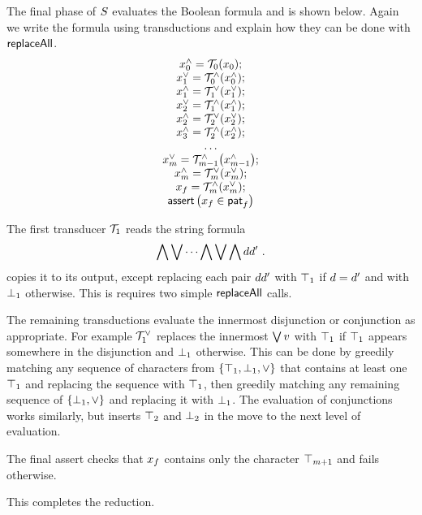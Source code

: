 The final phase of $S$ evaluates the Boolean formula and is shown below.
Again we write the formula using transductions and explain how they can be done
with $\mathsf{replaceAll}$.
\[
    \begin{array}{c}
        x^\land_0 = {\mathcal{T}_0}\mathord{\left(x_0\right)}; \\
        x^\lor_1 = {\mathcal{T}^\land_0}\mathord{\left(x^\land_0\right)}; \\
        x^\land_1 = {\mathcal{T}^\lor_1}\mathord{\left(x^\lor_1\right)}; \\
        x^\lor_2 = {\mathcal{T}^\land_1}\mathord{\left(x^\land_1\right)}; \\
        x^\land_2 = {\mathcal{T}^\lor_2}\mathord{\left(x^\lor_2\right)}; \\
        x^\land_3 = {\mathcal{T}^\land_2}\mathord{\left(x^\land_2\right)}; \\
        \ldots \\
        x^\lor_m
            = {\mathcal{T}^\land_{m-1}}\mathord{\left(x^\land_{m-1}\right)}; \\
        x^\land_m
            = {\mathcal{T}^\lor_m}\mathord{\left(x^\lor_{m}\right)}; \\
        x_f
            = {\mathcal{T}^\land_m}\mathord{\left(x^\lor_{m}\right)}; \\
        \textsf{assert}\left(x_f \in \mathsf{pat}_f\right)
    \end{array}
\]

The first transducer $\mathcal{T}_1$ reads the string formula
\[
    \bigwedge \bigvee \cdots \bigwedge \bigvee \bigwedge d d' \ .
\]
copies it to its output, except replacing each pair
$d d'$
with $\top_{1}$ if $d = d'$ and with $\bot_{1}$ otherwise.
This is requires two simple $\mathsf{replaceAll}$ calls.

The remaining transductions evaluate the innermost disjunction or conjunction as
appropriate. For example
$\mathcal{T}^\lor_1$
replaces the innermost
$\bigvee v$
with $\top_{1}$ if $\top_{1}$ appears somewhere in the disjunction and
$\bot_{1}$ otherwise.
This can be done by greedily matching any sequence of characters from
$\{ \top_{1}, \bot_{1}, \lor \}$
that contains at least one $\top_{1}$ and replacing the sequence with $\top_{1}$,
then greedily matching any remaining sequence of
$\{ \bot_{1}, \lor \}$
and replacing it with $\bot_{1}$.
The evaluation of conjunctions works similarly, but inserts $\top_{2}$ and $\bot_{2}$ in the move to the next level of evaluation.

The final assert checks that $x_f$ contains only the character $\top_{m+1}$
and fails otherwise.

This completes the reduction.
